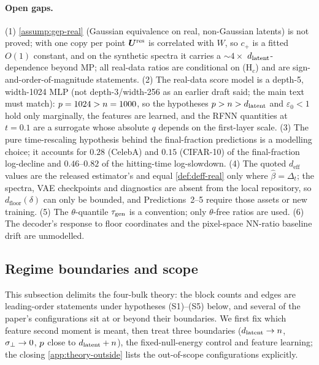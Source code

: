\paragraph{Open gaps.}
(1) \cref{assump:gep-real} (Gaussian equivalence on real, non-Gaussian latents) is not proved; with one copy per point $\bm{U}^{\rm res}$ is correlated with $W$, so $c_+$ is a fitted $O(1)$ constant, and on the synthetic spectra it carries a $\sim4\times$ $d_{\mathrm{latent}}$-dependence beyond MP; all real-data ratios are conditional on (H$_c$) and are sign-and-order-of-magnitude statements. (2) The real-data score model is a depth-5, width-1024 MLP (not depth-3/width-256 as an earlier draft said; the main text must match): $p=1024>n=1000$, so the hypotheses $p>n>d_{\mathrm{latent}}$ and $\varepsilon_0<1$ hold only marginally, the features are learned, and the RFNN quantities at $t=0.1$ are a surrogate whose absolute $q$ depends on the first-layer scale. (3) The pure time-rescaling hypothesis behind the final-fraction predictions is a modelling choice; it accounts for $0.28$ (CelebA) and $0.15$ (CIFAR-10) of the final-fraction log-decline and $0.46$--$0.82$ of the hitting-time log-slowdown. (4) The quoted $d_{\mathrm{eff}}$ values are the released estimator's and equal \cref{def:deff-real} only where $\hat\beta=\Delta_t$; the spectra, VAE checkpoints and diagnostics are absent from the local repository, so $d_{\mathrm{floor}}(\delta)$ can only be bounded, and Predictions~2--5 require those assets or new training. (5) The $\theta$-quantile $\tau_{\mathrm{gen}}$ is a convention; only $\theta$-free ratios are used. (6) The decoder's response to floor coordinates and the pixel-space NN-ratio baseline drift are unmodelled.

\subsection{Regime boundaries and scope}
\label{app:theory-scope}

This subsection delimits the four-bulk theory: the block counts and edges are leading-order statements under hypotheses (S1)--(S5) below, and several of the paper's configurations sit at or beyond their boundaries. We first fix which feature second moment is meant, then treat three boundaries ($d_{\mathrm{latent}}\to n$, $\sigma_{\perp}\to0$, $p$ close to $d_{\mathrm{latent}}+n$), the fixed-null-energy control and feature learning; the closing \cref{app:theory-outside} lists the out-of-scope configurations explicitly.

